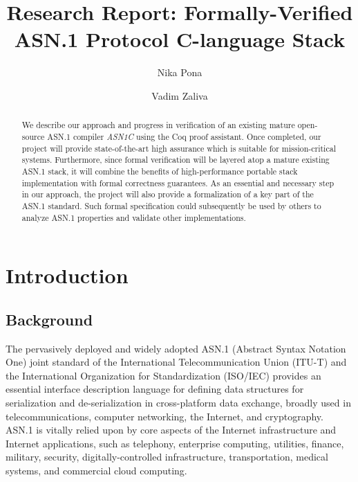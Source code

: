 \documentclass[acmsmall,nonacm]{acmart}
\begin{document}
\title{Research Report: Formally-Verified ASN.1 Protocol C-language Stack}

\author{Nika Pona}
\author{Vadim Zaliva}

\begin{abstract}

  We describe our approach and progress in verification of an existing
  mature open-source ASN.1 compiler \emph{ASN1C} using the Coq proof
  assistant. Once completed, our project will provide state-of-the-art
  high assurance which is suitable for mission-critical systems. Furthermore, since
  formal verification will be layered atop a mature existing ASN.1
  stack, it will combine the benefits of high-performance portable
  stack implementation with formal correctness guarantees. As an essential and necessary step in our
  approach, the project will also provide a formalization of a key part of
  the ASN.1 standard. Such formal specification could subsequently be
  used by others to analyze ASN.1 properties and validate other
  implementations.

\end{abstract}

\maketitle

\tableofcontents

\section{Introduction}

\subsection{Background}

The pervasively deployed and widely adopted ASN.1 (Abstract Syntax
Notation One) \cite{ASN1Intro} joint standard of the International
Telecommunication Union (ITU-T) and the International Organization for
Standardization (ISO/IEC) provides an essential interface description
language for defining data structures for serialization and
de-serialization in cross-platform data exchange, broadly used in
telecommunications, computer networking, the Internet, and
cryptography. ASN.1 is vitally relied upon by core aspects of the
Internet infrastructure and Internet applications, such as telephony,
enterprise computing, utilities, finance, military, security,
digitally-controlled infrastructure, transportation, medical systems,
and commercial cloud computing.
\end{document}
